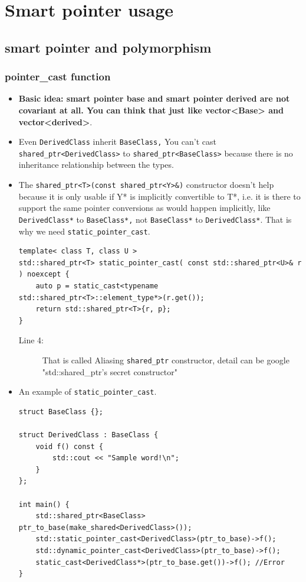 \documentclass[a4paper,11pt,twoside]{book}
\begin{document}
\section{Smart pointer usage}
\subsection{smart pointer and polymorphism}

\subsubsection{pointer\_cast function}
\begin{itemize}
	\item \textbf{Basic idea: smart pointer base and smart pointer derived are not covariant at all. You can think that just like vector<Base> and vector<derived>}.
			
	\item Even \texttt{DerivedClass} inherit \texttt{BaseClass,}  You can't cast \texttt{shared\_ptr<DerivedClass>} to \newline 
	\texttt{shared\_ptr<BaseClass>} because there is no inheritance relationship between the types. 
	
	\item The \texttt{shared\_ptr<T>(const shared\_ptr<Y>\&)} constructor doesn't help because it is only usable if Y* is implicitly convertible to T*, i.e. it is there to support the same pointer conversions as would happen implicitly, like \texttt{DerivedClass*} to \texttt{BaseClass*,} not \texttt{BaseClass*} to \texttt{DerivedClass*}. That is why we need \texttt{static\_pointer\_cast}.
\begin{lstlisting}
template< class T, class U > 
std::shared_ptr<T> static_pointer_cast( const std::shared_ptr<U>& r ) noexcept {
    auto p = static_cast<typename std::shared_ptr<T>::element_type*>(r.get());
    return std::shared_ptr<T>{r, p};
}
\end{lstlisting}
\begin{description}
	\item[Line 4:] That is called Aliasing \texttt{shared\_ptr} constructor, detail can be google "std::shared\_ptr's secret constructor"
\end{description}

	\item An example of \texttt{static\_pointer\_cast}.
\begin{lstlisting}
struct BaseClass {};

struct DerivedClass : BaseClass {
	void f() const {
		std::cout << "Sample word!\n";
	}
};

int main() {
	std::shared_ptr<BaseClass> ptr_to_base(make_shared<DerivedClass>());
	std::static_pointer_cast<DerivedClass>(ptr_to_base)->f();
	std::dynamic_pointer_cast<DerivedClass>(ptr_to_base)->f();
	static_cast<DerivedClass*>(ptr_to_base.get())->f(); //Error
}
\end{lstlisting}

\end{itemize}
\end{document}
